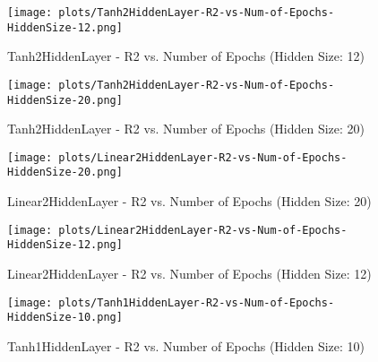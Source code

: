 
\begin{figure}[H]
    \centering
    \texttt{[image: plots/Tanh2HiddenLayer-R2-vs-Num-of-Epochs-HiddenSize-12.png]}
    \caption{Tanh2HiddenLayer - R2 vs. Number of Epochs (Hidden Size: 12)}
\end{figure}

\begin{figure}[H]
    \centering
    \texttt{[image: plots/Tanh2HiddenLayer-R2-vs-Num-of-Epochs-HiddenSize-20.png]}
    \caption{Tanh2HiddenLayer - R2 vs. Number of Epochs (Hidden Size: 20)}
\end{figure}

\begin{figure}[H]
    \centering
    \texttt{[image: plots/Linear2HiddenLayer-R2-vs-Num-of-Epochs-HiddenSize-20.png]}
    \caption{Linear2HiddenLayer - R2 vs. Number of Epochs (Hidden Size: 20)}
\end{figure}

\begin{figure}[H]
    \centering
    \texttt{[image: plots/Linear2HiddenLayer-R2-vs-Num-of-Epochs-HiddenSize-12.png]}
    \caption{Linear2HiddenLayer - R2 vs. Number of Epochs (Hidden Size: 12)}
\end{figure}

\begin{figure}[H]
    \centering
    \texttt{[image: plots/Tanh1HiddenLayer-R2-vs-Num-of-Epochs-HiddenSize-10.png]}
    \caption{Tanh1HiddenLayer - R2 vs. Number of Epochs (Hidden Size: 10)}
\end{figure}
